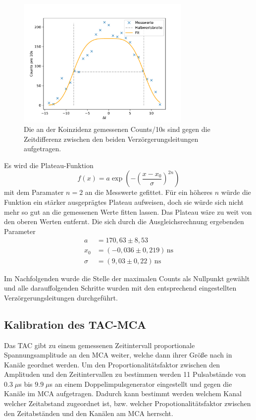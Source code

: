         \begin{figure}[h]
            \centering
            \includegraphics[width = 0.75\textwidth]{plots/Verzoergerung.pdf}
            \caption{Die an der Koinzidenz gemessenen Counts/10s sind gegen die Zeitdifferenz zwischen den beiden Verzörgerungsleitungen aufgetragen.}
            \label{fig:Verzoergerung}
        \end{figure}

        \FloatBarrier

        Es wird die Plateau-Funktion
        \begin{equation*}
            f(x) = a \exp\left(-\left(\frac{x - x_0}{\sigma}\right)^{2 n}\right)
        \end{equation*}
        mit dem Paramater $n = 2$ an die Messwerte gefittet.
        Für ein höheres $n$ würde die Funktion ein stärker ausgeprägtes Plateau aufweisen, doch sie würde sich nicht mehr so gut an die gemessenen Werte fitten lassen. Das Plateau wäre zu weit von den oberen Werten entfernt.
        Die sich durch die Ausgleichsrechnung ergebenden Parameter
        \begin{align*}
            a &= 170,63 \pm 8,53 \\
            x_0 &= (-0,036 \pm 0,219) \, \text{ns} \\
            \sigma &= (9,03 \pm 0,22) \, \text{ns}
        \end{align*}

        Im Nachfolgenden wurde die Stelle der maximalen Counts als Nullpunkt gewählt und alle darauffolgenden Schritte wurden mit den entsprechend eingestellten Verzörgerungsleitungen durchgeführt.

        \newpage
        \subsection{Kalibration des TAC-MCA}
        Das TAC gibt zu einem gemessenen Zeitintervall proportionale Spannungsamplitude an den MCA weiter, welche dann ihrer Größe nach in Kanäle geordnet werden. Um den Proportionalitätsfaktor zwischen den Amplituden und den Zeitintervallen zu bestimmen werden 11 Pulsabstände von $0.3\;\mu$s bis $9.9\;\mu$s an einem Doppelimpulsgenerator eingestellt und gegen die Kanäle im MCA aufgetragen. Dadurch kann bestimmt werden welchem Kanal welcher Zeitabstand zugeordnet ist, bzw. welcher Propotionalitätsfaktor zwischen den Zeitabständen und den Kanälen am MCA herrscht.

